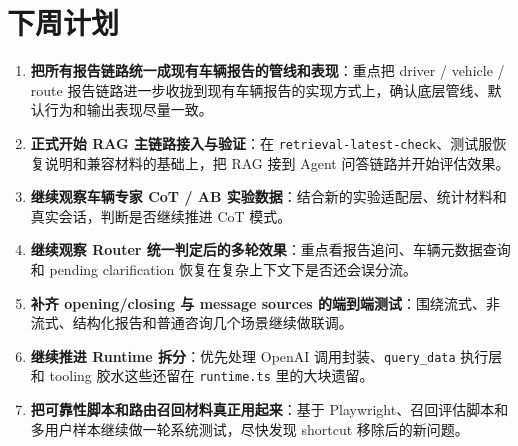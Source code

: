 \documentclass[UTF8]{ctexart}
\begin{document}
\section{下周计划}

\begin{enumerate}
\item \textbf{把所有报告链路统一成现有车辆报告的管线和表现}：重点把 driver / vehicle / route 报告链路进一步收拢到现有车辆报告的实现方式上，确认底层管线、默认行为和输出表现尽量一致。
\item \textbf{正式开始 RAG 主链路接入与验证}：在 \texttt{retrieval-latest-check}、测试服恢复说明和兼容材料的基础上，把 RAG 接到 Agent 问答链路并开始评估效果。
\item \textbf{继续观察车辆专家 CoT / AB 实验数据}：结合新的实验适配层、统计材料和真实会话，判断是否继续推进 CoT 模式。
\item \textbf{继续观察 Router 统一判定后的多轮效果}：重点看报告追问、车辆元数据查询和 pending clarification 恢复在复杂上下文下是否还会误分流。
\item \textbf{补齐 opening/closing 与 message sources 的端到端测试}：围绕流式、非流式、结构化报告和普通咨询几个场景继续做联调。
\item \textbf{继续推进 Runtime 拆分}：优先处理 OpenAI 调用封装、\texttt{query\_data} 执行层和 tooling 胶水这些还留在 \texttt{runtime.ts} 里的大块遗留。
\item \textbf{把可靠性脚本和路由召回材料真正用起来}：基于 Playwright、召回评估脚本和多用户样本继续做一轮系统测试，尽快发现 shortcut 移除后的新问题。
\end{enumerate}
\end{document}
